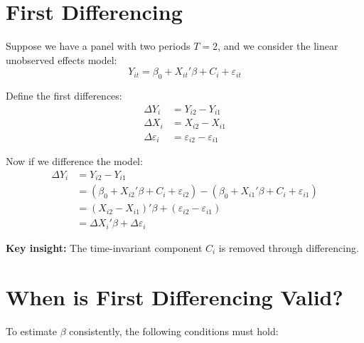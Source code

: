\documentclass[12pt, oneside]{article}
\begin{document}
\section*{First Differencing}

Suppose we have a panel with two periods \( T = 2 \), and we consider the linear unobserved effects model:
\[
Y_{it} = \beta_0 + X_{it}' \beta + C_i + \varepsilon_{it}
\]

Define the first differences:
\[
\begin{aligned}
\Delta Y_i &= Y_{i2} - Y_{i1} \\
\Delta X_i &= X_{i2} - X_{i1} \\
\Delta \varepsilon_i &= \varepsilon_{i2} - \varepsilon_{i1}
\end{aligned}
\]

Now if we difference the model:
\[
\begin{aligned}
\Delta Y_i &= Y_{i2} - Y_{i1} \\
&= (\beta_0 + X_{i2}' \beta + C_i + \varepsilon_{i2}) - (\beta_0 + X_{i1}' \beta + C_i + \varepsilon_{i1}) \\
&= (X_{i2} - X_{i1})' \beta + (\varepsilon_{i2} - \varepsilon_{i1}) \\
&= \Delta X_i' \beta + \Delta \varepsilon_i
\end{aligned}
\]

\noindent\textbf{Key insight:} The time-invariant component \( C_i \) is removed through differencing.

\section*{When is First Differencing Valid?}

To estimate \( \beta \) consistently, the following conditions must hold:
\end{document}
